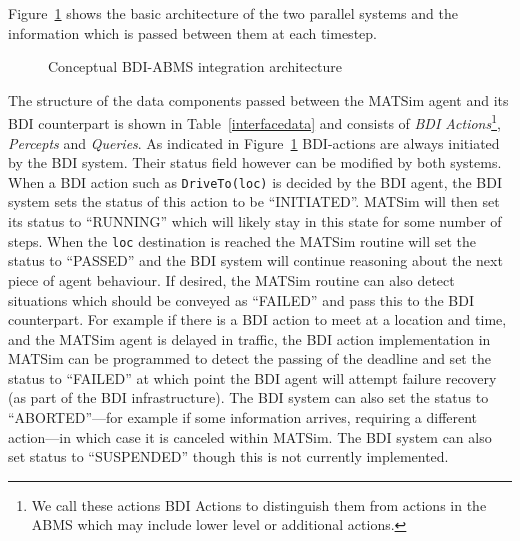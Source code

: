 Figure~\ref{architecture} shows the basic architecture of the
two parallel systems and the information which is passed between them
at each timestep.

\begin{figure}
\centering
\resizebox{0.75\textwidth}{!}{

}
\caption{Conceptual BDI-ABMS integration architecture}
\label{architecture}
\end{figure} 

The structure of the data components passed between the MATSim agent
and its BDI counterpart is shown in Table~\ref{interfacedata} and
consists of {\it BDI Actions}\footnote{We call these actions BDI
  Actions to distinguish them from actions in the ABMS which may
  include lower level or additional actions.}, {\it Percepts} and {\it
  Queries}. As indicated in Figure~\ref{architecture} BDI-actions are
always initiated by the BDI system. Their status field however can be
modified by both systems.  When a BDI action such as
\texttt{DriveTo(loc)} is decided by the BDI agent, the BDI system
sets the status of this action to be ``INITIATED''. MATSim will then
set its status to ``RUNNING'' which will likely stay in this state for
some number of steps. When the \texttt{loc} destination is reached
the MATSim routine will set the status to ``PASSED'' and the BDI
system will continue reasoning about the next piece of agent
behaviour. If desired, the MATSim routine can also detect situations
which should be conveyed as ``FAILED'' and pass this to the BDI
counterpart. For example if there is a BDI action to meet at a
location and time, and the MATSim agent is delayed in traffic, the BDI
action implementation in MATSim can be programmed to detect the
passing of the deadline and set the status to ``FAILED'' at which
point the BDI agent will attempt failure recovery (as part of the BDI
infrastructure). The BDI system can also set the status to 
``ABORTED''---for example if some information arrives, requiring a different
action---in which case it is canceled within MATSim. The BDI system
can also set status to ``SUSPENDED'' though this is not currently
implemented.


